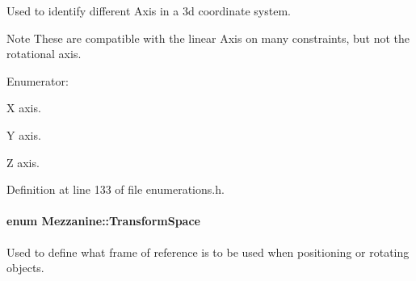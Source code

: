 Used to identify different Axis in a 3d coordinate system. 

\begin{DoxyNote}{Note}
These are compatible with the linear Axis on many constraints, but not the rotational axis. 
\end{DoxyNote}
\begin{Desc}
\item[Enumerator: ]\par
\begin{description}
\item[{\em 
\hypertarget{namespaceMezzanine_ab41a00a8c6a47b576dc987ec34e16ba1a823c8f182393aef96f017c7279d49126}{
Axis\_\-X}
\label{namespaceMezzanine_ab41a00a8c6a47b576dc987ec34e16ba1a823c8f182393aef96f017c7279d49126}
}]X axis. \item[{\em 
\hypertarget{namespaceMezzanine_ab41a00a8c6a47b576dc987ec34e16ba1a935c7afe0104697553cf85e9214fb3fb}{
Axis\_\-Y}
\label{namespaceMezzanine_ab41a00a8c6a47b576dc987ec34e16ba1a935c7afe0104697553cf85e9214fb3fb}
}]Y axis. \item[{\em 
\hypertarget{namespaceMezzanine_ab41a00a8c6a47b576dc987ec34e16ba1a6af6621383cc7da1fe11a86ba6de37c0}{
Axis\_\-Z}
\label{namespaceMezzanine_ab41a00a8c6a47b576dc987ec34e16ba1a6af6621383cc7da1fe11a86ba6de37c0}
}]Z axis. \end{description}
\end{Desc}



Definition at line 133 of file enumerations.h.

\hypertarget{namespaceMezzanine_ad81c74de3529f1e643bd145173924ed3}{
\paragraph[{TransformSpace}]{\setlength{\rightskip}{0pt plus 5cm}enum {\bf Mezzanine::TransformSpace}}\hfill}
\label{namespaceMezzanine_ad81c74de3529f1e643bd145173924ed3}


Used to define what frame of reference is to be used when positioning or rotating objects. 

